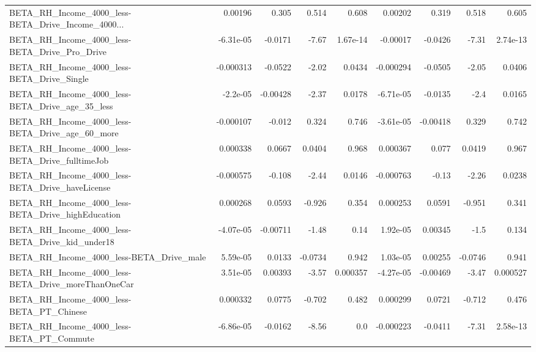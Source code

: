 \begin{tabular}{lrrrrrrrr}
BETA\_RH\_Income\_4000\_less-BETA\_Drive\_Income\_4000... &     0.00196 &        0.305 &     0.514 &    0.608 &    0.00202 &       0.319 &        0.518 &         0.605 \\
BETA\_RH\_Income\_4000\_less-BETA\_Drive\_Pro\_Drive      &   -6.31e-05 &      -0.0171 &     -7.67 & 1.67e-14 &   -0.00017 &     -0.0426 &        -7.31 &      2.74e-13 \\
BETA\_RH\_Income\_4000\_less-BETA\_Drive\_Single         &   -0.000313 &      -0.0522 &     -2.02 &   0.0434 &  -0.000294 &     -0.0505 &        -2.05 &        0.0406 \\
BETA\_RH\_Income\_4000\_less-BETA\_Drive\_age\_35\_less    &    -2.2e-05 &     -0.00428 &     -2.37 &   0.0178 &  -6.71e-05 &     -0.0135 &         -2.4 &        0.0165 \\
BETA\_RH\_Income\_4000\_less-BETA\_Drive\_age\_60\_more    &   -0.000107 &       -0.012 &     0.324 &    0.746 &  -3.61e-05 &    -0.00418 &        0.329 &         0.742 \\
BETA\_RH\_Income\_4000\_less-BETA\_Drive\_fulltimeJob    &    0.000338 &       0.0667 &    0.0404 &    0.968 &   0.000367 &       0.077 &       0.0419 &         0.967 \\
BETA\_RH\_Income\_4000\_less-BETA\_Drive\_haveLicense    &   -0.000575 &       -0.108 &     -2.44 &   0.0146 &  -0.000763 &       -0.13 &        -2.26 &        0.0238 \\
BETA\_RH\_Income\_4000\_less-BETA\_Drive\_highEducation  &    0.000268 &       0.0593 &    -0.926 &    0.354 &   0.000253 &      0.0591 &       -0.951 &         0.341 \\
BETA\_RH\_Income\_4000\_less-BETA\_Drive\_kid\_under18    &   -4.07e-05 &     -0.00711 &     -1.48 &     0.14 &   1.92e-05 &     0.00345 &         -1.5 &         0.134 \\
BETA\_RH\_Income\_4000\_less-BETA\_Drive\_male           &    5.59e-05 &       0.0133 &   -0.0734 &    0.942 &   1.03e-05 &     0.00255 &      -0.0746 &         0.941 \\
BETA\_RH\_Income\_4000\_less-BETA\_Drive\_moreThanOneCar &    3.51e-05 &      0.00393 &     -3.57 & 0.000357 &  -4.27e-05 &    -0.00469 &        -3.47 &      0.000527 \\
BETA\_RH\_Income\_4000\_less-BETA\_PT\_Chinese           &    0.000332 &       0.0775 &    -0.702 &    0.482 &   0.000299 &      0.0721 &       -0.712 &         0.476 \\
BETA\_RH\_Income\_4000\_less-BETA\_PT\_Commute           &   -6.86e-05 &      -0.0162 &     -8.56 &      0.0 &  -0.000223 &     -0.0411 &        -7.31 &      2.58e-13 \\

\end{tabular}
